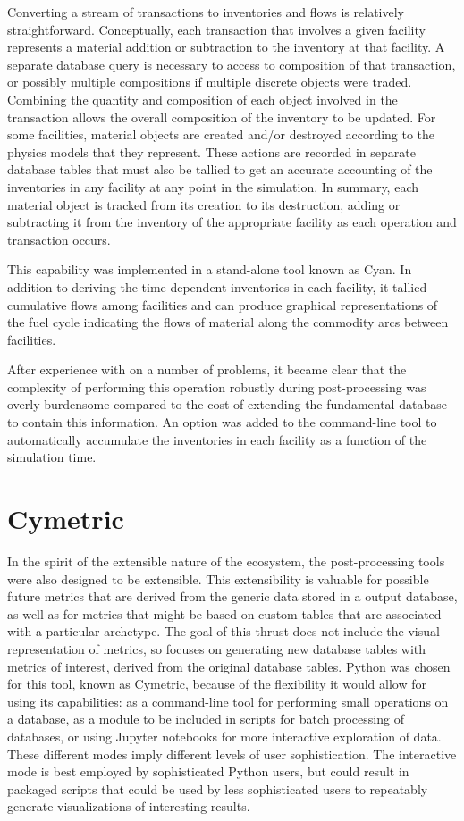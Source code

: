 Converting a stream of transactions to inventories and flows is relatively
straightforward.  Conceptually, each transaction that involves a given
facility represents a material addition or subtraction to the inventory at
that facility.  A separate database query is necessary to access to
composition of that transaction, or possibly multiple compositions if multiple
discrete objects were traded.  Combining the quantity and composition of each
object involved in the transaction allows the overall composition of the
inventory to be updated.  For some facilities, material objects are created
and/or destroyed according to the physics models that they represent.  These
actions are recorded in separate database tables that must also be tallied to
get an accurate accounting of the inventories in any facility at any point in
the simulation. In summary, each material object is tracked from its creation
to its destruction, adding or subtracting it from the inventory of the
appropriate facility as each operation and transaction occurs.

This capability was implemented in a stand-alone tool known as
Cyan.  In addition to deriving the time-dependent
inventories in each facility, it tallied cumulative flows among facilities and
can produce graphical representations of the fuel cycle indicating the flows
of material along the commodity arcs between facilities.

After experience with \Cyclus on a number of problems, it became clear that
the complexity of performing this operation robustly during post-processing
was overly burdensome compared to the cost of extending the fundamental
\Cyclus database to contain this information.  An option was added to the
\Cyclus command-line tool to automatically accumulate the inventories in each
facility as a function of the simulation time.

\section{Cymetric}

In the spirit of the extensible nature of the \Cyclus ecosystem, the
post-processing tools were also designed to be extensible.  This extensibility
is valuable for possible future metrics that are derived from the generic data
stored in a \Cyclus output database, as well as for metrics that might be
based on custom tables that are associated with a particular archetype.  The
goal of this thrust does not include the visual representation of metrics, so
focuses on generating new database tables with metrics of interest, derived
from the original database tables.  Python was chosen for this tool, known as
Cymetric, because of the flexibility it would allow for using its
capabilities: as a command-line tool for performing small operations on a
database, as a module to be included in scripts for batch processing of
databases, or using Jupyter notebooks for more interactive
exploration of data.  These different modes imply different levels of user
sophistication.  The interactive mode is best employed by sophisticated Python
users, but could result in packaged scripts that could be used by less
sophisticated users to repeatably generate visualizations of interesting
results.

